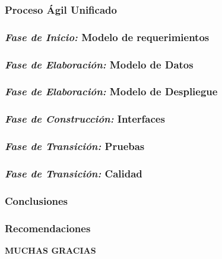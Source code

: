 \documentclass[xcolor=dvipsnames]{beamer}
\begin{document}
\begin{frame}
    \frametitle{Proceso Ágil Unificado}
\end{frame}

\begin{frame}
    \frametitle{\textit{Fase de Inicio:} Modelo de requerimientos}
\end{frame}

\begin{frame}
    \frametitle{\textit{Fase de Elaboración:} Modelo de Datos}
\end{frame}

\begin{frame}
    \frametitle{\textit{Fase de Elaboración:} Modelo de Despliegue}
\end{frame}

\begin{frame}
    \frametitle{\textit{Fase de Construcción:} Interfaces}
\end{frame}

\begin{frame}
    \frametitle{\textit{Fase de Transición:} Pruebas}
\end{frame}

\begin{frame}
    \frametitle{\textit{Fase de Transición:} Calidad}
\end{frame}

\begin{frame}
    \frametitle{Conclusiones}
\end{frame}

\begin{frame}
    \frametitle{Recomendaciones}
\end{frame}

\begin{frame}
    \centering\textbf{\huge{\textcolor{color1}{MUCHAS GRACIAS}}}    
\end{frame}
\end{document}
